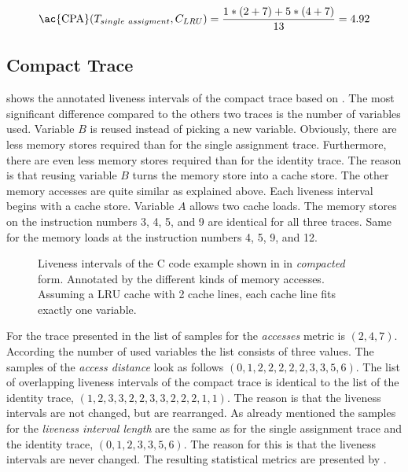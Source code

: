 \documentclass[onecolumn, openright, master, english, signatures]{dbrgrptt}
\begin{document}
\begin{equation}\label{equ:trace-transformation-sa-marked}
\text{\ac{CPA}}(T_{single~assigment}, C_{LRU}) = \frac{1 * (2 + 7) + 5 * (4 + 7)}{13} = 4.92
\end{equation}

\subsection{Compact Trace}
 shows the annotated liveness intervals of the compact trace based on .
The most significant difference compared to the others two traces is the number of variables used.
Variable $B$ is reused instead of picking a new variable.
Obviously, there are less memory stores required than for the single assignment trace.
Furthermore, there are even less memory stores required than for the identity \ac{trace}.
The reason is that reusing variable $B$ turns the memory store into a cache store.
The other memory accesses are quite similar as explained above.
Each liveness interval begins with a cache store.
Variable $A$ allows two cache loads.
The memory stores on the instruction numbers 3, 4, 5, and 9 are identical for all three traces.
Same for the memory loads at the instruction numbers 4, 5, 9, and 12.

\begin{figure}
  \centering
  
  \caption{Liveness intervals of the C code example shown in  in \emph{compacted} form. Annotated by the different kinds of memory accesses. Assuming a \ac{LRU} cache with 2 cache lines, each cache line fits exactly one variable.}
  \label{fig:trace-transformation-compact-marked}
\end{figure}

For the \ac{trace} presented in  the list of samples for the \emph{accesses} metric is $(2, 4, 7)$.
According the number of used variables the list consists of three values.
The samples of the \emph{access distance} look as follows $(0, 1, 2, 2, 2, 2, 2, 3, 3, 5, 6)$.
The list of overlapping liveness intervals of the compact \ac{trace} is identical to the list of the identity \ac{trace}, $(1, 2, 3, 3, 2, 2, 3, 3, 2, 2, 2, 1, 1)$.
The reason is that the liveness intervals are not changed, but are rearranged.
As already mentioned the samples for the \emph{liveness interval length} are the same as for the single assignment \ac{trace} and the identity \ac{trace}, $(0, 1, 2, 3, 3, 5, 6)$.
The reason for this is that the liveness intervals are never changed.
The resulting statistical metrics are presented by .
\end{document}
